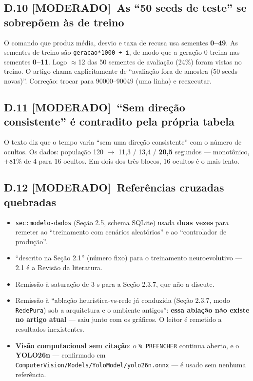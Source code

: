 \documentclass[11pt,a4paper]{article}
\newcommand{\moderado}{\textbf{\color{blue!50!black}[MODERADO]}}
\begin{document}
\subsection*{D.10 \moderado\ As ``50 seeds de teste'' se sobrepõem às de treino}

O comando que produz média, desvio e taxa de recusa usa sementes \textbf{0--49}. As sementes de
treino são \texttt{geracao*1000 + i}, de modo que a geração 0 treina nas sementes \textbf{0--11}.
Logo $\approx$12 das 50 sementes de avaliação (24\%) foram vistas no treino. O artigo chama
explicitamente de ``avaliação fora de amostra (50 seeds novas)''. Correção: trocar para 90000--90049
(uma linha) e reexecutar.

\subsection*{D.11 \moderado\ ``Sem direção consistente'' é contradito pela própria tabela}

O texto diz que o tempo varia ``sem uma direção consistente'' com o número de ocultos. Os dados:
população 120 $\rightarrow$ 11,3 / 13,4 / \textbf{20,5} segundos --- monotônico, $+81\%$ de 4 para 16
ocultos. Em dois dos três blocos, 16 ocultos é o mais lento.

\subsection*{D.12 \moderado\ Referências cruzadas quebradas}

\begin{itemize}
  \item \texttt{sec:modelo-dados} (Seção 2.5, schema SQLite) usada \textbf{duas vezes} para remeter
  ao ``treinamento com cenários aleatórios'' e ao ``controlador de produção''.
  \item ``descrito na Seção 2.1'' (número fixo) para o treinamento neuroevolutivo --- 2.1 é a Revisão
  da literatura.
  \item Remissão à saturação de 3 s para a Seção 2.3.7, que não a discute.
  \item Remissão à ``ablação heurística-vs-rede já conduzida (Seção 2.3.7, modo \texttt{RedePura})
  sob a arquitetura e o ambiente antigos'': \textbf{essa ablação não existe no artigo atual} --- saiu
  junto com os gráficos. O leitor é remetido a resultados inexistentes.
  \item \textbf{Visão computacional sem citação}: o \texttt{\% PREENCHER} continua aberto, e o
  \textbf{YOLO26n} --- confirmado em \texttt{ComputerVision/Models/YoloModel/yolo26n.onnx} --- é usado
  sem nenhuma referência.
\end{itemize}
\end{document}
